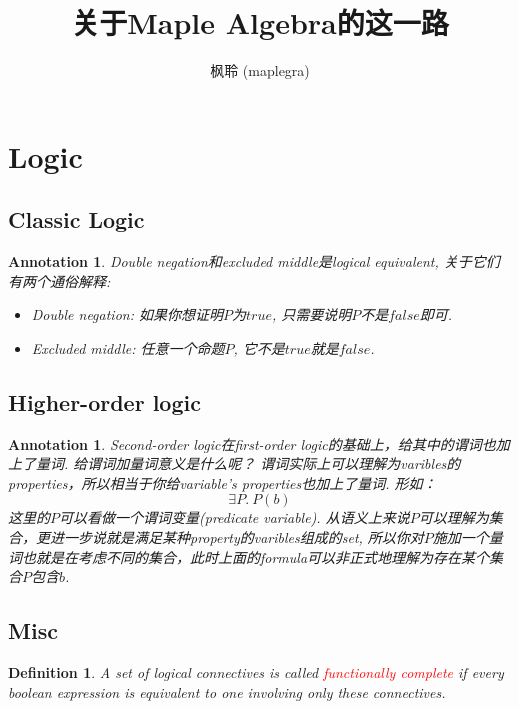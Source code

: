\documentclass{article}
\newtheorem{definition}[theorem]{Definition}
\newtheorem{annotation}[theorem]{Annotation}
\newcommand{\redt}[1]{\textcolor{red}{#1}}
\begin{document}
\title{关于Maple Algebra的这一路}
\author{枫聆 (maplegra)}
\maketitle
\tableofcontents
\newpage

\section{Logic}

\subsection{Classic Logic}

\begin{annotation}
\rm Double negation和excluded middle是logical equivalent, 关于它们有两个通俗解释:
\begin{itemize}
	\item Double negation: 如果你想证明$P$为$true$, 只需要说明$P$不是$false$即可.
	\item Excluded middle: 任意一个命题$P$, 它不是$true$就是$false$.
\end{itemize}
\end{annotation}

\subsection{Higher-order logic}

\begin{annotation}
\rm Second-order logic在first-order logic的基础上，给其中的谓词也加上了量词. 给谓词加量词意义是什么呢？ 谓词实际上可以理解为varibles的properties，所以相当于你给variable's properties也加上了量词. 形如：
\[
	\exists P.\ P(b)
\]
这里的$P$可以看做一个谓词变量(predicate variable). 从语义上来说$P$可以理解为集合，更进一步说就是满足某种property的varibles组成的set, 所以你对$P$施加一个量词也就是在考虑不同的集合，此时上面的formula可以非正式地理解为存在某个集合$P$包含$b$.
\end{annotation}

\subsection{Misc}

\begin{definition}
\rm A set of logical connectives is called \redt{functionally complete} if every boolean expression is equivalent to one involving only these connectives.
\end{definition}
\end{document}
